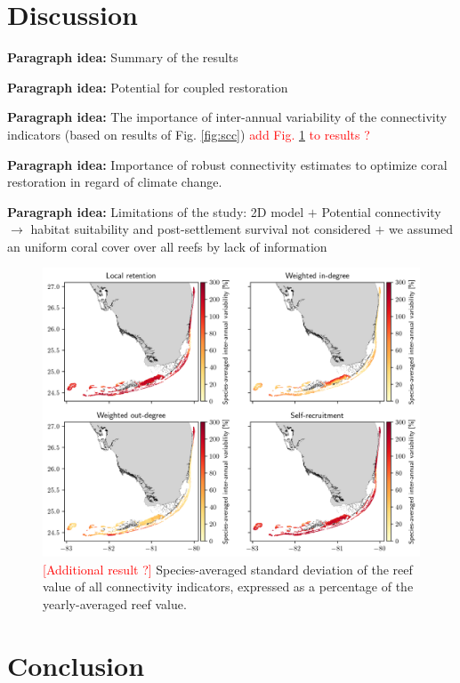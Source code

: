 \documentclass[fleqn,10pt]{wlscirep}
\begin{document}

\section*{Discussion}

\textbf{Paragraph idea:} Summary of the results

\textbf{Paragraph idea:} Potential for coupled restoration

\textbf{Paragraph idea:} The importance of inter-annual variability of the connectivity indicators (based on results of Fig. \ref{fig:scc}) \textcolor{red}{add Fig. \ref{fig:variabibility} to results ?}

\textbf{Paragraph idea:} Importance of robust connectivity estimates to optimize coral restoration in regard of climate change. 

\textbf{Paragraph idea:} Limitations of the study: 2D model $+$ Potential connectivity $\rightarrow$ habitat suitability and post-settlement survival not considered $+$ we assumed an uniform coral cover over all reefs by lack of 
information

\begin{figure}
    \centering
    \includegraphics[width=\textwidth]{figures/fig_std.png}
    \caption{\textcolor{red}{[Additional result ?]} Species-averaged standard deviation of the reef value of all connectivity indicators, expressed as a percentage of the yearly-averaged reef value.}\label{fig:variabibility}
\end{figure}

\section*{Conclusion}
\end{document}
